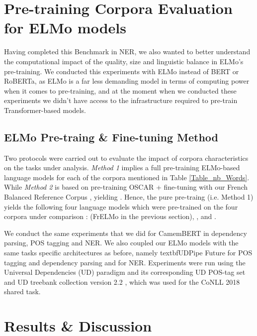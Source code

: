 \section{Pre-training Corpora Evaluation for ELMo models} \label{sect:EvalMethod}

Having completed this Benchmark in NER, we also wanted to better understand the computational impact of the quality, size and linguistic balance in ELMo's \citep{peters-etal-2018-deep} pre-training. We conducted this experiments with ELMo instead of BERT or RoBERTa, as ELMo is a far less demanding model in terms of computing power when it comes to pre-training, and at the moment when we conducted these experiments we didn't have access to the infrastructure required to pre-train Transformer-based models.

\subsection{ELMo Pre-traing \& Fine-tuning Method}\label{MethodTRAIN}

Two protocols were carried out to evaluate the impact of corpora characteristics on the tasks under analysis. \textit{Method 1} implies a full pre-training ELMo-based language models for each of the corpora mentioned in Table \ref{Table_nb_Words}. While \textit{Method 2} is based on pre-training OSCAR + fine-tuning with our French Balanced Reference Corpus \Cabernet, yielding \ELMocoscar. Hence, the pure pre-traing (i.e. Method 1) yields the following four language models which were pre-trained on the four corpora under comparison :  \ELMooscar (FrELMo in the previous section), \ELMowiki, \ELMococa and \ELMocbt.

We conduct the same experiments that we did for CamemBERT in dependency parsing, POS tagging and NER. We also coupled our ELMo models with the same tasks specific architectures as before, namely textbf{UDPipe Future} \citep{straka-2018-udpipe} for POS tagging and dependency parsing and \citep{strakova-etal-2019-neural} for NER. Experiments were run using the Universal Dependencies (UD) paradigm and its corresponding UD POS-tag set \citep{petrov-etal-2012-universal} and UD treebank collection version 2.2 \citep{nivre-etal-2018-universal}, which was used for the CoNLL 2018 shared task.

\section{Results \& Discussion} \label{sect:ResultsCorpora}

